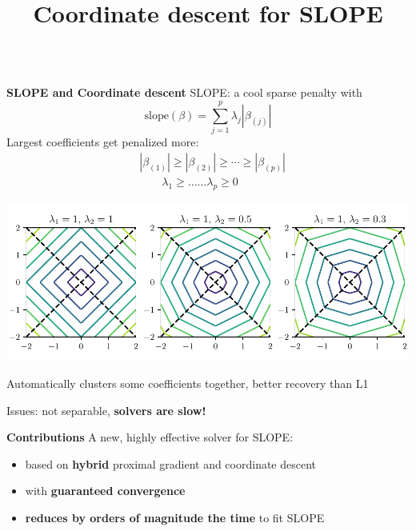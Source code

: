 \documentclass[english,final,t]{beamer}
\title{
	Coordinate descent for SLOPE}
\author{%
\texorpdfstring{
	\begin{minipage}{.98\linewidth}
	\begin{columns}%
		\column{.44\linewidth}
		\centering
		\Large Johan Larsson \\
		\large Lund University, Sweden \\[2em]
		\Large Mathurin Massias \\
		\large Univ. Lyon, Inria, CNRS, ENS de Lyon
		\column{.44\linewidth}
		\centering
		\Large Quentin Klopfenstein \\
		\large Université du Luxembourg \\[2em]
		\centering
		\Large Jonas Wallin \\
		\large Lund University, Sweden
	\end{columns}
	\vspace{1em}
\end{minipage}}{}
}
\begin{document}
\begin{frame}{}
\begin{columns}[t]
\begin{column}{.3\linewidth}
	\begin{block}{\textbf{\color{malgared} SLOPE and Coordinate descent}}
		\justifying
		SLOPE: a cool sparse penalty with \textbf{\color{malgared}{built-in coefficients clustering}}
		\begin{equation*}
			\mathrm{slope}(\beta) = \sum_{j=1}^p \lambda_j|\beta_{(j)}|
		\end{equation*}
		\vspace{.2em}
		Largest coefficients get penalized more:
		\vspace{.2em}
		\begin{align*}
		&|\beta_{(1)}| \geq |\beta_{(2)}| \geq \cdots \geq |\beta_{(p)}|  \\[5mm]
		& \quad \quad \lambda_1 \geq \ldots \ldots \lambda_p \geq 0
		\end{align*}

		\vspace{.3em}

		\begin{center}
		\includegraphics[width=0.8\linewidth]{./images/slope_level_lines
		}
		\end{center}

		Automatically clusters some coefficients together, better recovery than L1
		\vspace{.4em}

		Issues: not separable, \textbf{\textcolor{malgared}{solvers are slow!}}

	\end{block}
	\begin{block}{\textbf{\color{malgared} Contributions}}
			A new, highly effective solver for SLOPE:
			\vspace{1em}
			\begin{itemize}
				\item  based on \textbf{\color{malgared}hybrid} proximal gradient and coordinate descent
				\item  with \textbf{\color{malgared}guaranteed convergence}
				\item  \textbf{\color{malgared}reduces by orders of magnitude the time}
				 to fit SLOPE
			\end{itemize}
	\end{block}


\end{column}
\end{columns}
\end{frame}
\end{document}
